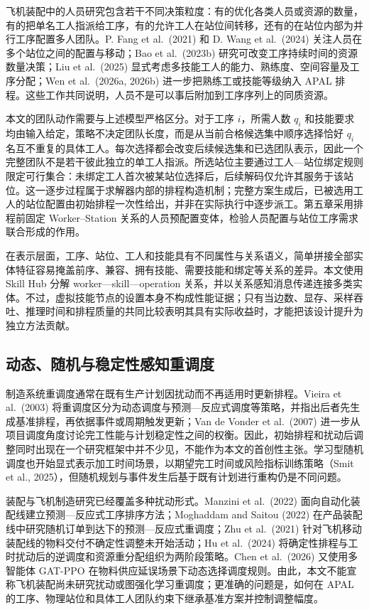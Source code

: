 \documentclass[journal,10pt]{IEEEtran}
\begin{document}
飞机装配中的人员研究包含若干不同决策粒度：有的优化各类人员或资源的数量，有的把单名工人指派给工序，有的允许工人在站位间转移，还有的在站位内部为并行工序配置多人团队。P. Fang et al.~(2021) 和 D. Wang et al.~(2024) 关注人员在多个站位之间的配置与移动；Bao et al.~(2023b) 研究可改变工序持续时间的资源数量决策；Liu et al.~(2025) 显式考虑多技能工人的能力、熟练度、空间容量及工序分配；Wen et al.~(2026a, 2026b) 进一步把熟练工或技能等级纳入 APAL 排程。这些工作共同说明，人员不是可以事后附加到工序序列上的同质资源。

本文的团队动作需要与上述模型严格区分。对于工序 \(i\)，所需人数 \(q_i\) 和技能要求均由输入给定，策略不决定团队长度，而是从当前合格候选集中顺序选择恰好 \(q_i\) 名互不重复的具体工人。每次选择都会改变后续候选集和已选团队表示，因此一个完整团队不是若干彼此独立的单工人指派。所选站位主要通过工人---站位绑定规则限定可行集合：未绑定工人首次被某站位选择后，后续解码仅允许其服务于该站位。这一逐步过程属于求解器内部的排程构造机制；完整方案生成后，已被选用工人的站位配置由初始排程一次性给出，并非在实际执行中逐步派工。第五章采用排程前固定 Worker--Station 关系的人员预配置变体，检验人员配置与站位工序需求联合形成的作用。

在表示层面，工序、站位、工人和技能具有不同属性与关系语义，简单拼接全部实体特征容易掩盖前序、兼容、拥有技能、需要技能和绑定等关系的差异。本文使用 Skill Hub 分解 worker---skill---operation 关系，并以关系感知消息传递连接多类实体。不过，虚拟技能节点的设置本身不构成性能证据；只有当边数、显存、采样吞吐、推理时间和排程质量的共同比较表明其具有实际收益时，才能把该设计提升为独立方法贡献。

\subsection{动态、随机与稳定性感知重调度}\label{ux52a8ux6001ux968fux673aux4e0eux7a33ux5b9aux6027ux611fux77e5ux91cdux8c03ux5ea6}

制造系统重调度通常在既有生产计划因扰动而不再适用时更新排程。Vieira et al.~(2003) 将重调度区分为动态调度与预测---反应式调度等策略，并指出后者先生成基准排程，再依据事件或周期触发更新；Van de Vonder et al.~(2007) 进一步从项目调度角度讨论完工性能与计划稳定性之间的权衡。因此，初始排程和扰动后调整同时出现在一个研究框架中并不少见，不能作为本文的首创性主张。学习型随机调度也开始显式表示加工时间场景，以期望完工时间或风险指标训练策略（Smit et al., 2025），但随机规划与事件发生后基于既有计划进行重构仍是不同问题。

装配与飞机制造研究已经覆盖多种扰动形式。Manzini et al.~(2022) 面向自动化装配线建立预测---反应式工序排序方法；Moghaddam and Saitou (2022) 在产品装配线中研究随机订单到达下的预测---反应式重调度；Zhu et al.~(2021) 针对飞机移动装配线的物料交付不确定性调整未开始活动；Hu et al.~(2024) 将确定性排程与工时扰动后的逆调度和资源重分配组织为两阶段策略。Chen et al.~(2026) 又使用多智能体 GAT-PPO 在物料供应延误场景下动态选择调度规则。由此，本文不能宣称飞机装配尚未研究扰动或图强化学习重调度；更准确的问题是，如何在 APAL 的工序、物理站位和具体工人团队约束下继承基准方案并控制调整幅度。
\end{document}
